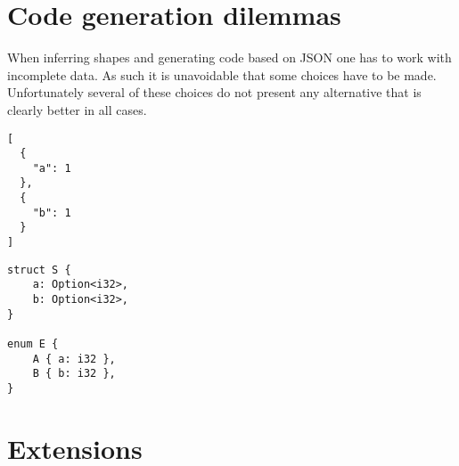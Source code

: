\section{Code generation dilemmas}
\label{sec:design-considerations}

When inferring shapes and generating code based on JSON one has to work with incomplete data. As such it is unavoidable that some choices have to be made. Unfortunately several of these choices do not present any alternative that is clearly better in all cases.




\begin{listing}[ht!]
\begin{verbatim}
[
  {
    "a": 1
  },
  {
    "b": 1
  }
]
\end{verbatim}
\caption{JSON Dilemma \#1}
\label{lst:json-dilemma-1}
\end{listing}

\begin{listing}[ht!]
\begin{verbatim}
struct S {
    a: Option<i32>,
    b: Option<i32>,
}

enum E {
    A { a: i32 },
    B { b: i32 },
}
\end{verbatim}
\caption{JSON Dilemma \#1 - Two solutions}
\label{lst:json-dilemma-1-rs}
\end{listing}

\section{Extensions}





